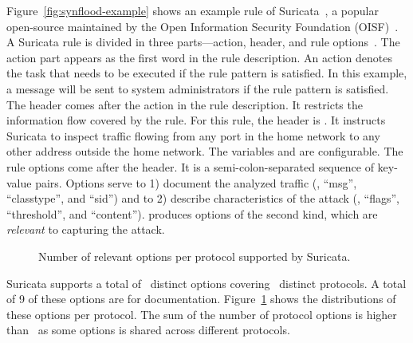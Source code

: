\documentclass[runningheads]{llncs}
\begin{document}
Figure~\ref{fig:synflood-example} shows an example rule of
Suricata~\cite{suricata}, a popular open-source \nids{} maintained by
the Open Information Security Foundation (OISF)~\cite{oisf}. A
Suricata rule is divided in three parts---action, header, and rule
options~\cite{suri-rule-format}. The action part appears as the first
word in the rule description. An action denotes the task that needs to
be executed if the rule pattern is satisfied. In this example, a
message will be sent to system administrators if the rule pattern is
satisfied. The header comes after the action in the rule
description. It restricts the information flow covered by the
rule. For this rule, the header is . It instructs Suricata to inspect 
traffic flowing from any port in the home network to any other address
outside the home network. The variables  and
 are configurable. The rule options come after
the header. It is a semi-colon-separated sequence of key-value
pairs. Options serve to 1) document the analyzed traffic (\eg{},
``msg'', ``classtype'', and ``sid'') and to 2) describe
characteristics of the attack (\eg, ``flags'', ``threshold'', and
``content''). \tname{} produces options of the second kind, which are
\emph{relevant} to capturing the attack.

\begin{figure}
  \centering
  \vspace{-7ex}
  \vspace{-2ex}
  \caption{\label{fig:distribution-rules-protocol}Number of relevant
    options per protocol supported by Suricata.}
\end{figure}
Suricata supports a total of \totoptions\ distinct options covering
\numproto\ distinct protocols. A total of 9 of these options are for
documentation. Figure~\ref{fig:distribution-rules-protocol} shows
the distributions of these options per protocol. The sum of
the number of protocol options is higher than \totoptions\ as some
options is shared across different protocols.
\end{document}
